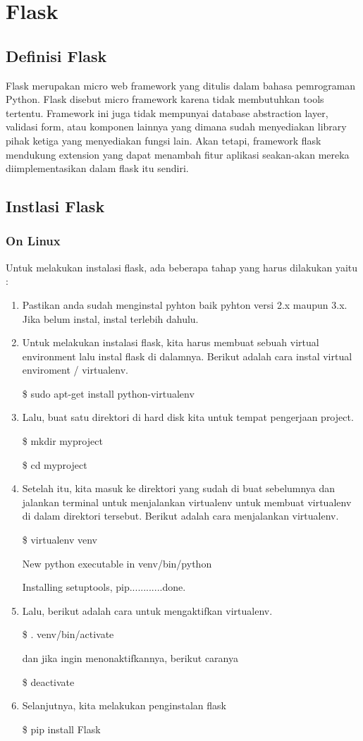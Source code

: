 \documentclass[12pt,a4paper]{article}
\begin{document}
\section{Flask}
\subsection{Definisi Flask}
Flask merupakan micro web framework yang ditulis dalam bahasa pemrograman Python. Flask disebut micro framework karena tidak membutuhkan tools tertentu. Framework ini juga tidak mempunyai database abstraction layer, validasi form, atau komponen lainnya yang dimana sudah menyediakan library pihak ketiga yang menyediakan fungsi lain. Akan tetapi, framework flask mendukung extension yang dapat menambah fitur aplikasi seakan-akan mereka diimplementasikan dalam flask itu sendiri.
\subsection{Instlasi Flask}
\subsubsection{On Linux}
Untuk melakukan instalasi flask, ada beberapa tahap yang harus dilakukan yaitu :
\begin{enumerate}
\item Pastikan anda sudah menginstal pyhton baik pyhton versi 2.x maupun 3.x. Jika belum instal, instal terlebih dahulu.

\item Untuk melakukan instalasi flask, kita harus membuat sebuah virtual environment lalu instal flask di dalamnya. Berikut adalah cara instal virtual enviroment / virtualenv.

\$ sudo apt-get install python-virtualenv

\item Lalu, buat satu direktori di hard disk kita untuk tempat pengerjaan project. 

\$ mkdir myproject

\$ cd myproject

\item Setelah itu, kita masuk ke direktori yang sudah di buat sebelumnya dan jalankan terminal untuk menjalankan virtualenv untuk membuat virtualenv di dalam direktori tersebut. Berikut adalah cara menjalankan virtualenv.

\$ virtualenv venv

New python executable in venv/bin/python

Installing setuptools, pip............done.

\item Lalu, berikut adalah cara untuk mengaktifkan virtualenv.

\$ . venv/bin/activate 

dan jika ingin menonaktifkannya, berikut caranya 

\$ deactivate

\item Selanjutnya, kita melakukan penginstalan flask

\$ pip install Flask
\end{enumerate}
\end{document}
